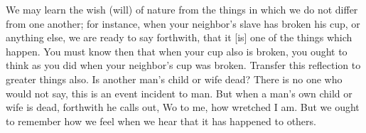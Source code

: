 We may  learn the  wish (will) of  nature from  the things in  which we  do not
differ from  one another; for instance,  when your neighbor's slave  has broken
his cup, or anything  else, we are ready to say forthwith, that  it [is] one of
the things which happen. You must know  then that when your cup also is broken,
you ought  to think as  you did when your  neighbor's cup was  broken. Transfer
this reflection  to greater things also.  Is another man's child  or wife dead?
There is no one who would not say, this is an event incident to man. But when a
man's own child or wife is dead, forthwith he calls out, Wo to me, how wretched
I am. But we ought to remember how we feel when we hear that it has happened to
others.
